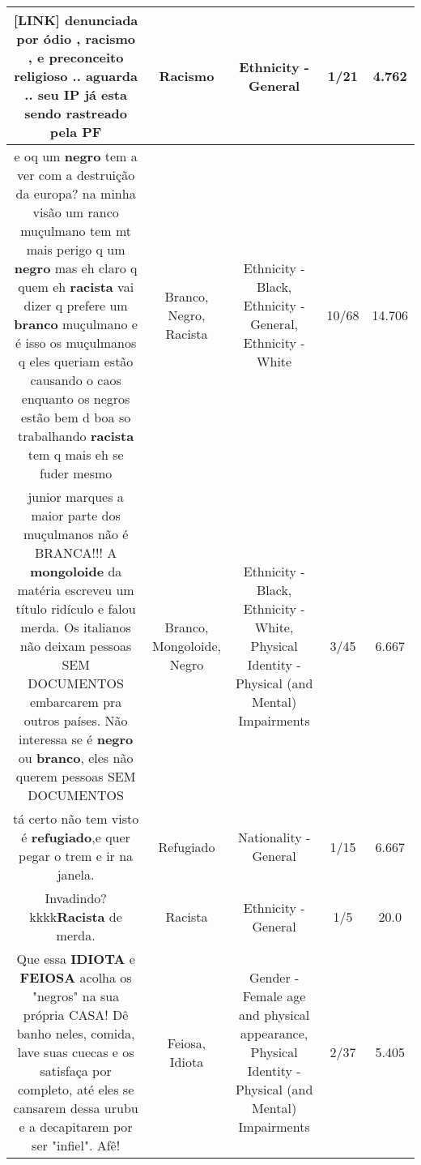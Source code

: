 \documentclass[11pt]{article}
\newlength\mylength
\begin{document}
\begin{center}
\begin{longtable}{|C{.65\mylength}|C{.30\mylength}|C{.12\mylength}|C{.12\mylength}|C{.12\mylength}|}
  \small  [LINK] denunciada por ódio , \textbf{racismo} , e preconceito religioso ..  aguarda .. seu IP já esta sendo rastreado  pela PF\normalsize   & Racismo & Ethnicity - General & 1/21 & 4.762 \\  \hline
  \small e oq um \textbf{negro} tem a ver com a destruição da europa? na minha visão um ranco muçulmano tem mt mais perigo q um \textbf{negro} mas eh claro q quem eh \textbf{racista} vai dizer q prefere um \textbf{branco} muçulmano e é isso os muçulmanos q eles queriam estão causando o caos enquanto os negros estão bem d boa so trabalhando \textbf{racista} tem q mais eh se fuder mesmo\normalsize   & Branco, Negro, Racista & Ethnicity - Black, Ethnicity - General, Ethnicity - White & 10/68 & 14.706 \\  \hline
  \small junior marques a maior parte dos muçulmanos não é BRANCA!!! A \textbf{mongoloide} da matéria escreveu um título ridículo e falou merda. Os italianos não deixam pessoas SEM DOCUMENTOS embarcarem pra outros países. Não interessa se é \textbf{negro} ou \textbf{branco}, eles não querem pessoas SEM DOCUMENTOS\normalsize   & Branco, Mongoloide, Negro & Ethnicity - Black, Ethnicity - White, Physical Identity - Physical (and Mental) Impairments & 3/45 & 6.667 \\  \hline
  \small tá certo não tem visto é  \textbf{refugiado},e quer pegar o trem e ir na janela.\normalsize   & Refugiado & Nationality - General & 1/15 & 6.667 \\  \hline
  \small Invadindo? kkkk\textbf{Racista} de merda.\normalsize   & Racista & Ethnicity - General & 1/5 & 20.0 \\  \hline
  \small Que essa \textbf{IDIOTA} e \textbf{FEIOSA} acolha os "negros" na sua própria CASA! Dê banho neles, comida, lave suas cuecas e os satisfaça por completo, até eles se cansarem dessa urubu e a decapitarem por ser "infiel". Afê!\normalsize   & Feiosa, Idiota & Gender - Female age and physical appearance, Physical Identity - Physical (and Mental) Impairments & 2/37 & 5.405 \\  \hline

\end{longtable}
\end{center}
\end{document}
